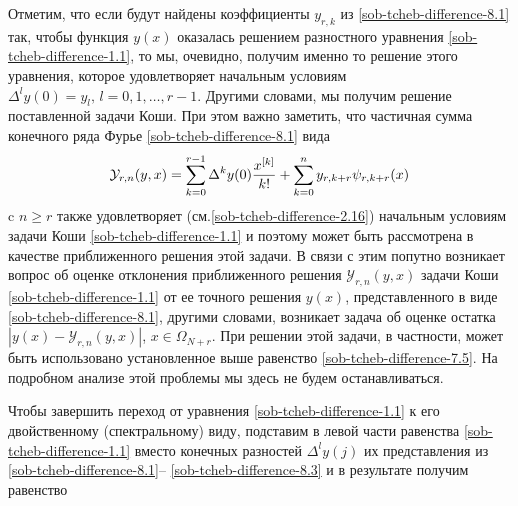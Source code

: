 Отметим, что если будут найдены коэффициенты $y_{r,k}$ из  \eqref{sob-tcheb-difference-8.1}  так, чтобы функция $y(x)$ оказалась решением разностного уравнения \eqref{sob-tcheb-difference-1.1}, то мы, очевидно, получим именно то решение этого уравнения, которое удовлетворяет начальным условиям $\Delta^{l}y(0)=y_l, \, l=0,1,\ldots,r-1$. Другими словами, мы получим решение поставленной задачи Коши. При этом важно заметить, что частичная сумма конечного ряда   Фурье \eqref{sob-tcheb-difference-8.1} вида
\begin{equation}\label{sob-tcheb-difference-8.5}
 \mathcal{Y}_{r,n}(y,x)= \sum_{k=0}^{r-1}\Delta^ky(0){x^{[k]}\over k!} +\sum_{k=0}^ny_{r,k+r} \psi_{r,k+r}(x)
  \end{equation}
c $n\ge r$ также удовлетворяет (см.\eqref{sob-tcheb-difference-2.16}) начальным условиям задачи Коши \eqref{sob-tcheb-difference-1.1} и поэтому может быть рассмотрена в качестве приближенного решения этой задачи. В связи с этим попутно возникает вопрос об оценке отклонения приближенного решения $\mathcal{Y}_{r,n}(y,x)$ задачи Коши \eqref{sob-tcheb-difference-1.1} от ее точного решения $y(x)$, представленного в виде \eqref{sob-tcheb-difference-8.1}, другими словами, возникает задача об оценке остатка $|y(x)-\mathcal{Y}_{r,n}(y,x)|$, $x \in \Omega_{N+r}$. При решении этой задачи, в частности, может быть использовано установленное выше равенство \eqref{sob-tcheb-difference-7.5}. На подробном анализе этой проблемы мы здесь не будем останавливаться.

Чтобы завершить переход от уравнения  \eqref{sob-tcheb-difference-1.1} к его двойственному (спектральному) виду,
подставим в левой части равенства \eqref{sob-tcheb-difference-1.1} вместо конечных разностей $\Delta^l y(j)$
их представления из \eqref{sob-tcheb-difference-8.1}-- \eqref{sob-tcheb-difference-8.3} и в результате получим равенство

